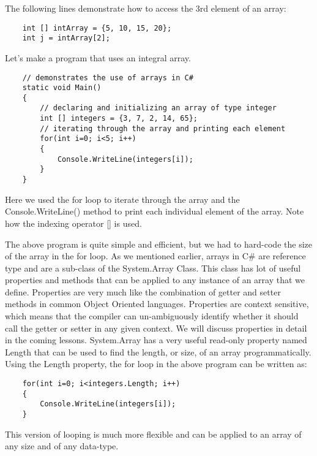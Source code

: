 The following lines demonstrate how to access the 3rd element of an array:

\begin{lstlisting}
    int [] intArray = {5, 10, 15, 20};
    int j = intArray[2];        
\end{lstlisting}

Let’s make a program that uses an integral array.

\begin{lstlisting}
    // demonstrates the use of arrays in C#
    static void Main()
    {
        // declaring and initializing an array of type integer
        int [] integers = {3, 7, 2, 14, 65};
        // iterating through the array and printing each element
        for(int i=0; i<5; i++)
        {
            Console.WriteLine(integers[i]);
        }
    }        
\end{lstlisting}

Here we used the for loop to iterate through the array and the Console.WriteLine() method to print each individual
element of the array. Note how the indexing operator [] is used.

The above program is quite simple and efficient, but we had to hard-code the size of the array in the for loop. As we
mentioned earlier, arrays in C\# are reference type and are a sub-class of the System.Array Class. This class has lot
of useful properties and methods that can be applied to any instance of an array that we define. Properties are very
much like the combination of getter and setter methods in common Object Oriented languages. Properties are
context sensitive, which means that the compiler can un-ambiguously identify whether it should call the getter or
setter in any given context. We will discuss properties in detail in the coming lessons. System.Array has a very
useful read-only property named Length that can be used to find the length, or size, of an array programmatically.\\

Using the Length property, the for loop in the above program can be written as:

\begin{lstlisting}
    for(int i=0; i<integers.Length; i++)
    {
        Console.WriteLine(integers[i]);
    }    
\end{lstlisting}

This version of looping is much more flexible and can be applied to an array of any size and of any data-type.\\

